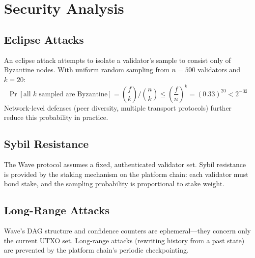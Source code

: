\section{Security Analysis}

\label{sec:wave-security}

\subsection{Eclipse Attacks}

An eclipse attack attempts to isolate a validator's sample to consist only of Byzantine
nodes. With uniform random sampling from $n = 500$ validators and $k = 20$:
\[
\Pr[\text{all } k \text{ sampled are Byzantine}] = \binom{f}{k} / \binom{n}{k}
\leq \left(\frac{f}{n}\right)^k = (0.33)^{20} < 2^{-32}
\]
Network-level defenses (peer diversity, multiple transport protocols) further reduce this
probability in practice.

\subsection{Sybil Resistance}

The Wave protocol assumes a fixed, authenticated validator set. Sybil resistance is
provided by the staking mechanism on the platform chain: each validator must bond
stake, and the sampling probability is proportional to stake weight.

\subsection{Long-Range Attacks}

Wave's DAG structure and confidence counters are ephemeral---they concern only the
current UTXO set. Long-range attacks (rewriting history from a past state) are prevented
by the platform chain's periodic checkpointing.

